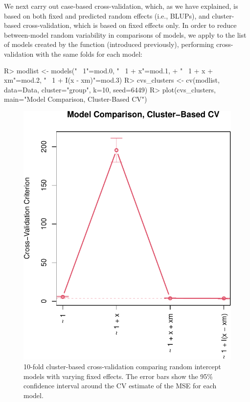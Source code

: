 \documentclass[
]{jss}
\begin{document}
We next carry out case-based cross-validation, which, as we have
explained, is based on both fixed and predicted random effects (i.e.,
BLUPs), and cluster-based cross-validation, which is based on fixed
effects only. In order to reduce between-model random variability in
comparisons of models, we apply  to the list of models
created by the  function (introduced previously),
performing cross-validation with the same folds for each model:

\begin{CodeChunk}
\begin{CodeInput}
R> modlist <- models("~ 1"=mod.0, "~ 1 + x"=mod.1, 
+                   "~ 1 + x + xm"=mod.2, "~ 1 + I(x - xm)"=mod.3)
R> cvs_clusters <- cv(modlist, data=Data, cluster="group", k=10, seed=6449)
R> plot(cvs_clusters, main="Model Comparison, Cluster-Based CV")
\end{CodeInput}
\begin{figure}

{\centering \includegraphics[width=1\linewidth]{JSS-article-reduced_files/figure-latex/cross-validation-clusters-1} 

}

\caption[10-fold cluster-based cross-validation comparing random intercept models with varying fixed effects]{10-fold cluster-based cross-validation comparing random intercept models with varying fixed effects. The error bars show the 95\% confidence interval around the CV estimate of the MSE for each model.}\label{fig:cross-validation-clusters}
\end{figure}
\end{CodeChunk}
\end{document}
